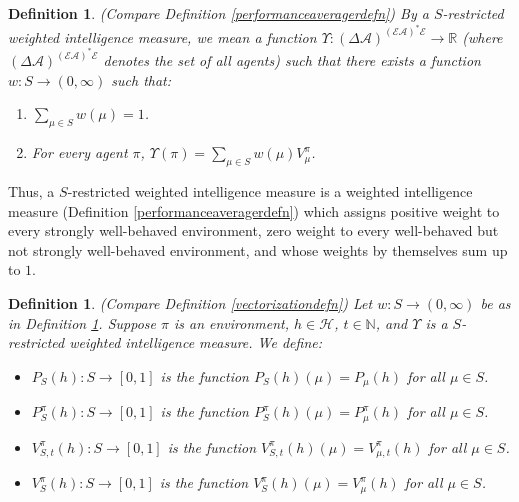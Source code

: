 \documentclass[twoside]{article}
\newtheorem{definition}[theorem]{Definition}
\begin{document}
\begin{definition}
\label{swbperformanceaveragerdefn}
    (Compare Definition \ref{performanceaveragerdefn})
    By a \emph{$S$-restricted weighted intelligence measure},
    we mean a function
    $
        \Upsilon:
        (\Delta\mathcal A)^{(\mathcal E\mathcal A)^*\mathcal E}
        \to
        \mathbb R
    $
    (where
    $(\Delta\mathcal A)^{(\mathcal E\mathcal A)^*\mathcal E}$ denotes the set of all agents)
    such that there exists a function $w:S\to (0,\infty)$ such that:
    \begin{enumerate}
        \item
        $\sum_{\mu\in S}w(\mu)=1$.
        \item
        For every agent $\pi$, $\Upsilon(\pi)=\sum_{\mu\in S}w(\mu) V^\pi_\mu$.
    \end{enumerate}
\end{definition}

Thus, a $S$-restricted weighted intelligence measure is
a weighted intelligence measure (Definition \ref{performanceaveragerdefn})
which assigns positive weight to every strongly well-behaved environment,
zero weight to every well-behaved but not strongly well-behaved environment,
and whose weights by themselves sum up to $1$.

\begin{definition}
\label{infinitedimensionalvectorizationdefn}
    (Compare Definition \ref{vectorizationdefn})
    Let $w:S\to(0,\infty)$ be as in Definition \ref{swbperformanceaveragerdefn}.
    Suppose $\pi$ is an environment, $h\in\mathcal H$, $t\in\mathbb N$,
    and $\Upsilon$ is a $S$-restricted weighted intelligence measure. We define:
    \begin{itemize}
        \item
            $P_{S}(h):S\to [0,1]$ is the function
            $P_{S}(h)(\mu)=P_\mu(h)$ for all $\mu\in S$.
        \item
            $P^\pi_{S}(h):S\to [0,1]$ is the function
            $P^\pi_{S}(h)(\mu)=P^\pi_\mu(h)$ for all $\mu\in S$.
        \item
            $V^\pi_{S,t}(h):S\to [0,1]$ is the function
            $V^\pi_{S,t}(h)(\mu)=V^\pi_{\mu,t}(h)$ for all $\mu\in S$.
        \item
            $V^\pi_{S}(h):S\to [0,1]$ is the function
            $V^\pi_{S}(h)(\mu)=V^\pi_\mu(h)$ for all $\mu\in S$.
    \end{itemize}
\end{definition}
\end{document}
